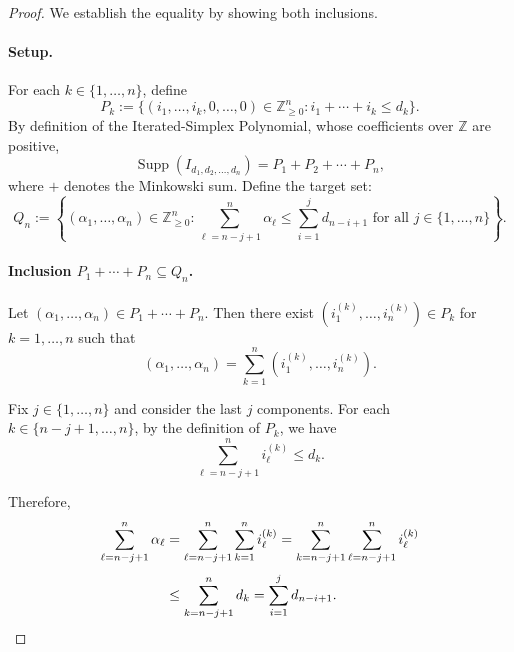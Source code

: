 \begin{proof}
	We establish the equality by showing both inclusions.
	
	\paragraph{Setup.}
	For each $k \in \{1, \ldots, n\}$, define
	\begin{equation*}
		P_k := \{(i_1, \ldots, i_k, 0, \ldots, 0) \in \mathbb{Z}_{\geq 0}^n : i_1 + \cdots + i_k \leq d_k\}.
	\end{equation*}
	By definition of the Iterated-Simplex Polynomial, whose coefficients over $\mathbb{Z}$ are positive,
	\begin{equation*}
		\operatorname{Supp}(I_{d_1, d_2, \ldots, d_n}) = P_1 + P_2 + \cdots + P_n,
	\end{equation*}
	where $+$ denotes the Minkowski sum. Define the target set:
	\begin{equation*}
		Q_n := \left\{(\alpha_1, \ldots, \alpha_n) \in \mathbb{Z}_{\geq 0}^n : \sum_{\ell=n-j+1}^{n} \alpha_\ell \leq \sum_{i=1}^{j} d_{n-i+1} \text{ for all } j \in \{1, \ldots, n\}\right\}.
	\end{equation*}
	
	\paragraph{Inclusion $P_1 + \cdots + P_n \subseteq Q_n$.}
	Let $(\alpha_1, \ldots, \alpha_n) \in P_1 + \cdots + P_n$. Then there exist $(i_1^{(k)}, \ldots, i_n^{(k)}) \in P_k$ for $k = 1, \ldots, n$ such that
	\begin{equation*}
		(\alpha_1, \ldots, \alpha_n) = \sum_{k=1}^{n} (i_1^{(k)}, \ldots, i_n^{(k)}).
	\end{equation*}
	
	Fix $j \in \{1, \ldots, n\}$ and consider the last $j$ components. For each $k \in \{n-j+1, \ldots, n\}$, by the definition of $P_k$, we have
	\begin{equation*}
		\sum_{\ell=n-j+1}^{n} i_\ell^{(k)} \leq d_k.
	\end{equation*}
	
	Therefore,
	\begin{align*}
		\sum_{\ell=n-j+1}^{n} \alpha_\ell 
		&= \sum_{\ell=n-j+1}^{n} \sum_{k=1}^{n} i_\ell^{(k)} 
		= \sum_{k=n-j+1}^{n} \sum_{\ell=n-j+1}^{n} i_\ell^{(k)} \\[0.3em]\notag
		&\leq \sum_{k=n-j+1}^{n} d_k 
		= \sum_{i=1}^{j} d_{n-i+1}.
	\end{align*}
	

\end{proof}
